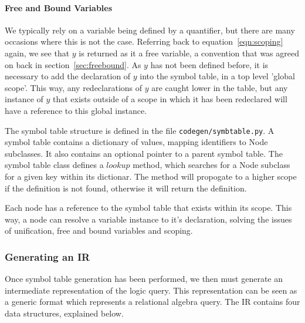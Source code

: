 \documentclass[a4paper, 11pt]{article}
\begin{document}
      \paragraph{Free and Bound Variables}
        We typically rely on a variable being defined by a quantifier, but
        there are many occasions where this is not the case. Referring back to
        equation~\ref{eqn:scoping} again, we see that $y$ is returned as it a
        free variable, a convention that was agreed on back in
        section~\ref{sec:freebound}. As $y$ has not been defined before, it is
        necessary to add the declaration of $y$ into the symbol table, in a top
        level 'global scope'. This way, any redeclarations of $y$ are caught
        lower in the table, but any instance of $y$ that exists outside of a
        scope in which it has been redeclared will have a reference to this
        global instance.

      The symbol table structure is defined in the file
      \texttt{codegen/symbtable.py}. A symbol table contains a dictionary of
      values, mapping identifiers to Node subclasses. It also contains an
      optional pointer to a parent symbol table. The symbol table class defines
      a $lookup$ method, which searches for a Node subclass for a given key
      within its dictionar. The method will propogate to a higher scope if the
      definition is not found, otherwise it will return the definition.

      Each node has a reference to the symbol table that exists within its
      scope. This way, a node can resolve a variable instance to it's
      declaration, solving the issues of unification, free and bound variables
      and scoping.

    \subsubsection{Generating an IR}

      Once symbol table generation has been performed, we then must generate an
      intermediate representation of the logic query. This representation can
      be seen as a generic format which represents a relational algebra
      query. The IR contains four data structures, explained below.
\end{document}
